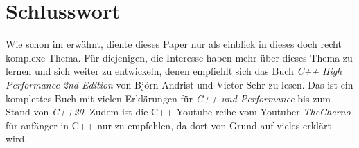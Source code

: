\section{Schlusswort}\label{sec:schlusswort}
Wie schon im \emph{} erwähnt, diente dieses Paper nur als einblick in dieses
doch recht komplexe Thema. Für diejenigen, die Interesse haben mehr über dieses Thema zu lernen
und sich weiter zu entwickeln, denen empfiehlt sich das Buch \emph{C++ High Performance 2nd
Edition} von Björn Andrist und Victor Sehr zu lesen. Das ist ein komplettes Buch mit vielen
Erklärungen für \emph{C++ und Performance} bis zum Stand von \emph{C++20}. Zudem ist die C++
Youtube reihe vom Youtuber \emph{TheCherno} für anfänger in C++ nur zu empfehlen, da dort von
Grund auf vieles erklärt wird.